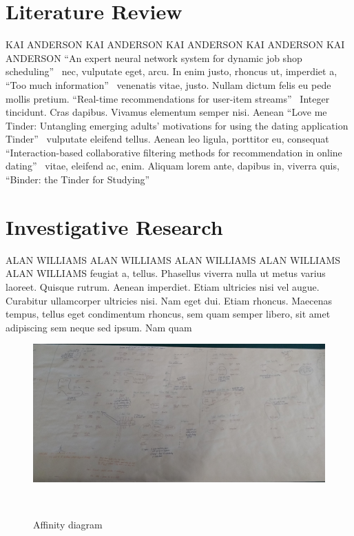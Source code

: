 \documentclass{sigchi-ext}
\begin{document}
\section{Literature Review}
KAI ANDERSON KAI ANDERSON KAI ANDERSON KAI ANDERSON KAI ANDERSON
``An expert neural network system for dynamic job shop scheduling''~\cite{sim1994expert}
nec, vulputate eget, arcu. In enim justo, rhoncus ut, imperdiet a,
``Too much information''~\cite{christensen2006too}
venenatis vitae, justo. Nullam dictum felis eu pede mollis pretium.
``Real-time recommendations for user-item streams''~\cite{lommatzsch2015real}
Integer tincidunt. Cras dapibus. Vivamus elementum semper nisi. Aenean
``Love me Tinder: Untangling emerging adults' motivations for using the dating application Tinder''~\cite{sumter2017love}
vulputate eleifend tellus. Aenean leo ligula, porttitor eu, consequat
``Interaction-based collaborative filtering methods for recommendation in online dating''~\cite{krzywicki2010interaction}
vitae, eleifend ac, enim. Aliquam lorem ante, dapibus in, viverra quis,
``Binder: the Tinder for Studying''~\cite{binder}



\section{Investigative Research}
ALAN WILLIAMS ALAN WILLIAMS ALAN WILLIAMS ALAN WILLIAMS ALAN WILLIAMS 
feugiat a, tellus. Phasellus viverra nulla ut metus varius laoreet.
Quisque rutrum. Aenean imperdiet. Etiam ultricies nisi vel augue.
Curabitur ullamcorper ultricies nisi. Nam eget dui.
Etiam rhoncus. Maecenas tempus, tellus eget condimentum rhoncus, sem
quam semper libero, sit amet adipiscing sem neque sed ipsum. Nam quam

\begin{figure}
  \includegraphics[width=0.9\columnwidth]{figures/affinity_diagram.jpg}
  \caption{Affinity diagram}~\label{fig:sample}
\end{figure}
\end{document}
